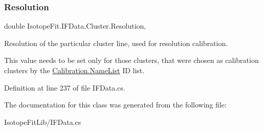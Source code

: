 \subsubsection{\texorpdfstring{Resolution}{Resolution}}
{\footnotesize\ttfamily double Isotope\+Fit.\+I\+F\+Data.\+Cluster.\+Resolution\hspace{0.3cm}{\ttfamily [get]}, {\ttfamily [set]}}



Resolution of the particular cluster line, used for resolution calibration. 

This value needs to be set only for those clusters, that were chosen as calibration clusters by the \mbox{\hyperlink{class_isotope_fit_1_1_i_f_data_1_1_calibration_a2e347f087df878f22010302bda7db4be}{Calibration.\+Name\+List}} ID list. 

Definition at line 237 of file I\+F\+Data.\+cs.



The documentation for this class was generated from the following file\+:\begin{DoxyCompactItemize}
\item 
Isotope\+Fit\+Lib/I\+F\+Data.\+cs\end{DoxyCompactItemize}
